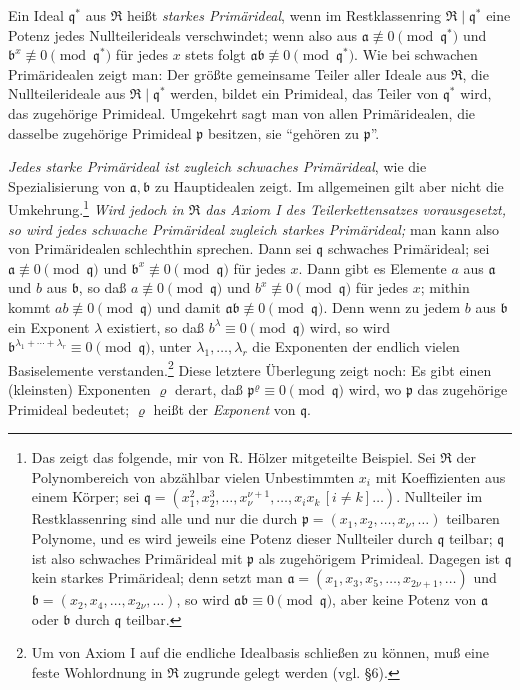 \documentclass[11pt]{article}
\providecommand{\mR}{\mathfrak{R}}
\providecommand{\ma}{\mathfrak{a}}
\providecommand{\mb}{\mathfrak{b}}
\providecommand{\mpideal}{\mathfrak{p}}
\providecommand{\mq}{\mathfrak{q}}
\begin{document}
Ein Ideal $\mq^*$ aus $\mR$ heißt \emph{starkes Primärideal}, wenn im Restklassenring $\mR\mid\mq^*$ eine Potenz jedes Nullteilerideals verschwindet; wenn also aus $\ma\not\equiv0\pmod{\mq^*}$ und $\mb^x\not\equiv0\pmod{\mq^*}$ für jedes $x$ stets folgt $\ma\mb\not\equiv0\pmod{\mq^*}$. Wie bei schwachen Primäridealen zeigt man: Der größte gemeinsame Teiler aller Ideale aus $\mR$, die Nullteilerideale aus $\mR\mid\mq^*$ werden, bildet ein Primideal, das Teiler von $\mq^*$ wird, das zugehörige Primideal. Umgekehrt sagt man von allen Primäridealen, die dasselbe zugehörige Primideal $\mpideal$ besitzen, sie ``gehören zu $\mpideal$''.

\emph{Jedes starke Primärideal ist zugleich schwaches Primärideal}, wie die Spezialisierung von $\ma,\mb$ zu Hauptidealen zeigt. Im allgemeinen gilt aber nicht die Umkehrung.\footnote{Das zeigt das folgende, mir von R. Hölzer mitgeteilte Beispiel. Sei $\mR$ der Polynombereich von abzählbar vielen Unbestimmten $x_i$ mit Koeffizienten aus einem Körper; sei $\mq=(x_1^2,x_2^3,\ldots,x_\nu^{\nu+1},\ldots,x_i x_k\,[i\ne k]\ldots)$. Nullteiler im Restklassenring sind alle und nur die durch $\mpideal=(x_1,x_2,\ldots,x_\nu,\ldots)$ teilbaren Polynome, und es wird jeweils eine Potenz dieser Nullteiler durch $\mq$ teilbar; $\mq$ ist also schwaches Primärideal mit $\mpideal$ als zugehörigem Primideal. Dagegen ist $\mq$ kein starkes Primärideal; denn setzt man $\ma=(x_1,x_3,x_5,\ldots,x_{2\nu+1},\ldots)$ und $\mb=(x_2,x_4,\ldots,x_{2\nu},\ldots)$, so wird $\ma\mb\equiv0\pmod{\mq}$, aber keine Potenz von $\ma$ oder $\mb$ durch $\mq$ teilbar.} \emph{Wird jedoch in $\mR$ das Axiom I des Teilerkettensatzes vorausgesetzt, so wird jedes schwache Primärideal zugleich starkes Primärideal;} man kann also von Primäridealen schlechthin sprechen. Dann sei $\mq$ schwaches Primärideal; sei $\ma\not\equiv0\pmod{\mq}$ und $\mb^x\not\equiv0\pmod{\mq}$ für jedes $x$. Dann gibt es Elemente $a$ aus $\ma$ und $b$ aus $\mb$, so daß $a\not\equiv0\pmod{\mq}$ und $b^x\not\equiv0\pmod{\mq}$ für jedes $x$; mithin kommt $ab\not\equiv0\pmod{\mq}$ und damit $\ma\mb\not\equiv0\pmod{\mq}$. Denn wenn zu jedem $b$ aus $\mb$ ein Exponent $\lambda$ existiert, so daß $b^\lambda\equiv0\pmod{\mq}$ wird, so wird $\mb^{\lambda_1+\cdots+\lambda_r}\equiv0\pmod{\mq}$, unter $\lambda_1,\ldots,\lambda_r$ die Exponenten der endlich vielen Basiselemente verstanden.\footnote{Um von Axiom I auf die endliche Idealbasis schließen zu können, muß eine feste Wohlordnung in $\mR$ zugrunde gelegt werden (vgl. §6).} Diese letztere Überlegung zeigt noch: Es gibt einen (kleinsten) Exponenten $\varrho$ derart, daß $\mpideal^\varrho\equiv0\pmod{\mq}$ wird, wo $\mpideal$ das zugehörige Primideal bedeutet; $\varrho$ heißt der \emph{Exponent} von $\mq$.
\end{document}
